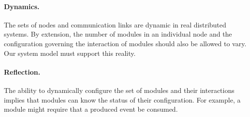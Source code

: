 \documentclass[letterpaper]{article}
\begin{document}

\paragraph{Dynamics.}
The sets of nodes and communication links are dynamic in real distributed systems.
By extension, the number of modules in an individual node and the configuration governing the interaction of modules should also be allowed to vary.
Our system model must support this reality.

\paragraph{Reflection.}
The ability to dynamically configure the set of modules and their interactions implies that modules can know the status of their configuration.
For example, a module might require that a produced event be consumed.
\end{document}
